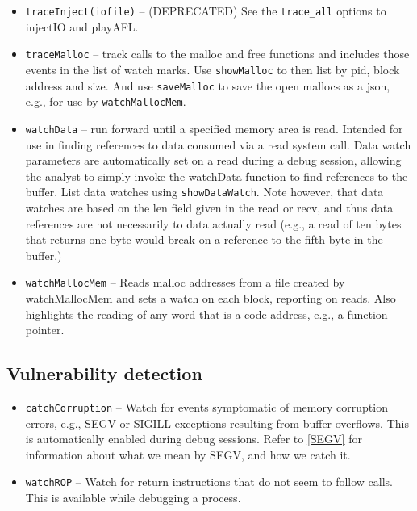 \documentclass[titlepage]{article}
\begin{document}
\begin{itemize}
\begin{itemize}
\end{itemize}

\item {\tt traceInject(iofile)} -- (DEPRECATED) See the {\tt trace\_all} options to injectIO and playAFL.

\item{\tt traceMalloc} -- track calls to the malloc and free functions and includes those events in the list of watch marks. Use {\tt showMalloc} to 
then list by pid, block address and size.  And use {\tt saveMalloc} to save the open mallocs as a json, e.g., for use by {\tt watchMallocMem}.

\item {\tt watchData} – run forward until a specified memory area is read.  Intended for use in finding references to data consumed via a read system call.  Data watch parameters are automatically set on a read during a debug session, allowing the analyst to simply invoke the watchData function to find references to the buffer.  List data watches using {\tt showDataWatch}.
Note however, that data watches are based on the len field given in the read or recv, and thus data references are not necessarily to data actually read (e.g., a read of ten bytes
that returns one byte would break on a reference to the fifth byte in the buffer.)
\item {\tt watchMallocMem} – Reads malloc addresses from a file created by watchMallocMem and sets a watch on each block, reporting on reads.  Also highlights
the reading of any word that is a code address, e.g., a function pointer.

\end{itemize}

\subsection{Vulnerability detection}
\begin{itemize}
\item {\tt catchCorruption} – Watch for events symptomatic of memory corruption errors, e.g., SEGV or SIGILL exceptions resulting from buffer overflows.  This is automatically enabled during debug sessions. Refer to \ref{SEGV} for information about what we mean by SEGV, and how we catch it.

\item {\tt watchROP} -- Watch for return instructions that do not seem to follow calls.  This is available while debugging a process.
\end{itemize}
\end{document}
